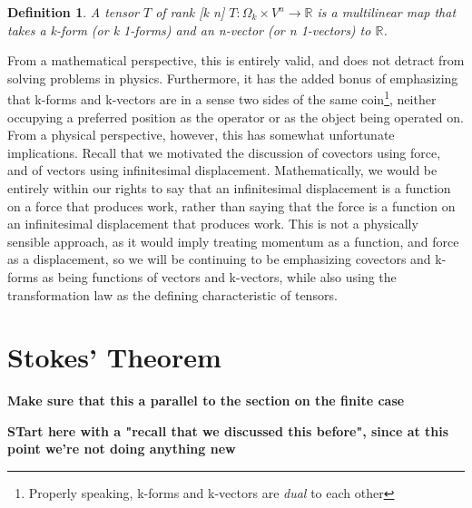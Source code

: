 \documentclass{book}
\newtheorem{defn}[equation]{Definition}
\begin{document}
\begin{defn}
	A tensor $T$ of rank [k n] $T: \Omega_k \times V^n \to \mathbb{R}$ is a multilinear map that takes a k-form (or k 1-forms) and an n-vector (or n 1-vectors) to $\mathbb{R}$. 
\end{defn}

From a mathematical perspective, this is entirely valid, and does not detract from solving problems in physics. Furthermore, it has the added bonus of emphasizing that k-forms and k-vectors are in a sense two sides of the same coin\footnote{Properly speaking, k-forms and k-vectors are \emph{dual} to each other}, neither occupying a preferred position as the operator or as the object being operated on. From a physical perspective, however, this has somewhat unfortunate implications. Recall that we motivated the discussion of covectors using force, and of vectors using infinitesimal displacement. Mathematically, we would be entirely within our rights to say that an infinitesimal displacement is a function on a force that produces work, rather than saying that the force is a function on an infinitesimal displacement that produces work. This is not a physically sensible approach, as it would imply treating momentum as a function, and force as a displacement, so we will be continuing to be emphasizing covectors and k-forms as being functions of vectors and k-vectors, while also using the transformation law as the defining characteristic of tensors.



\section{Stokes' Theorem}

\textbf{Make sure that this a parallel to the section on the finite case}

\textbf{STart here with a "recall that we discussed this before", since at this point we're not doing anything new}
\end{document}
